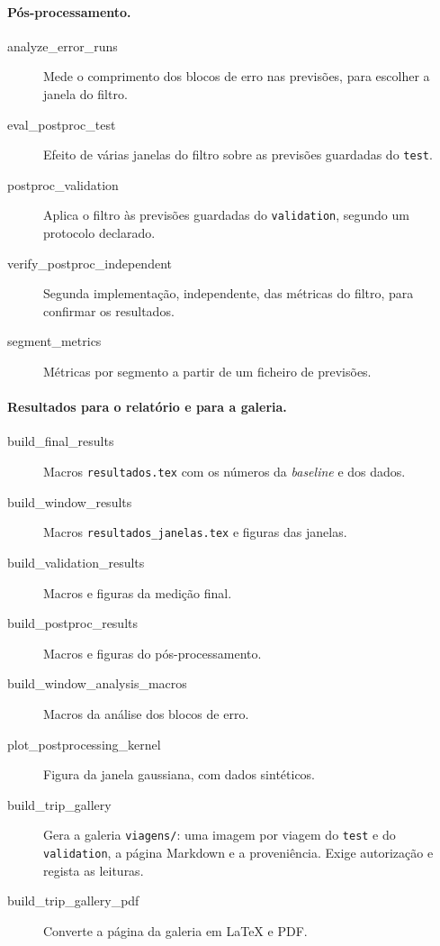 \documentclass[11pt,a4paper]{article}
\newcommand{\f}[1]{\texttt{#1}}
\begin{document}
\paragraph{Pós-processamento.}
\begin{description}
\item[analyze\_error\_runs] Mede o comprimento dos blocos de erro nas previsões, para escolher a
  janela do filtro.
\item[eval\_postproc\_test] Efeito de várias janelas do filtro sobre as previsões guardadas do
  \f{test}.
\item[postproc\_validation] Aplica o filtro às previsões guardadas do \f{validation}, segundo um
  protocolo declarado.
\item[verify\_postproc\_independent] Segunda implementação, independente, das métricas do filtro,
  para confirmar os resultados.
\item[segment\_metrics] Métricas por segmento a partir de um ficheiro de previsões.
\end{description}

\paragraph{Resultados para o relatório e para a galeria.}
\begin{description}
\item[build\_final\_results] Macros \f{resultados.tex} com os números da \emph{baseline} e dos
  dados.
\item[build\_window\_results] Macros \f{resultados\_janelas.tex} e figuras das janelas.
\item[build\_validation\_results] Macros e figuras da medição final.
\item[build\_postproc\_results] Macros e figuras do pós-processamento.
\item[build\_window\_analysis\_macros] Macros da análise dos blocos de erro.
\item[plot\_postprocessing\_kernel] Figura da janela gaussiana, com dados sintéticos.
\item[build\_trip\_gallery] Gera a galeria \f{viagens/}: uma imagem por viagem do \f{test} e do
  \f{validation}, a página Markdown e a proveniência. Exige autorização e regista as leituras.
\item[build\_trip\_gallery\_pdf] Converte a página da galeria em LaTeX e PDF.
\end{description}
\end{document}

